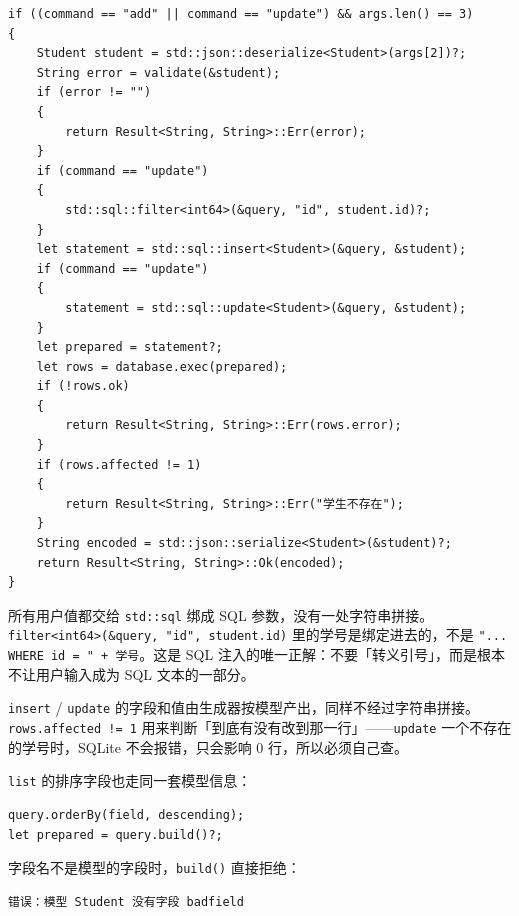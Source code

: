 \par
\medskip
\begin{lstlisting}[style=chali]
if ((command == "add" || command == "update") && args.len() == 3)
{
    Student student = std::json::deserialize<Student>(args[2])?;
    String error = validate(&student);
    if (error != "")
    {
        return Result<String, String>::Err(error);
    }
    if (command == "update")
    {
        std::sql::filter<int64>(&query, "id", student.id)?;
    }
    let statement = std::sql::insert<Student>(&query, &student);
    if (command == "update")
    {
        statement = std::sql::update<Student>(&query, &student);
    }
    let prepared = statement?;
    let rows = database.exec(prepared);
    if (!rows.ok)
    {
        return Result<String, String>::Err(rows.error);
    }
    if (rows.affected != 1)
    {
        return Result<String, String>::Err("学生不存在");
    }
    String encoded = std::json::serialize<Student>(&student)?;
    return Result<String, String>::Ok(encoded);
}
\end{lstlisting}
\par
\medskip

所有用户值都交给 \texttt{std:\allowbreak{}:\allowbreak{}sql} 绑成 SQL 参数，没有一处字符串拼接。 \texttt{filter<\allowbreak{}int64>\allowbreak{}(\allowbreak{}\&query,\allowbreak{} "id",\allowbreak{} student.\allowbreak{}id)\allowbreak{}} 里的学号是绑定进去的，不是 \texttt{".\allowbreak{}.\allowbreak{}.\allowbreak{} WHERE id =\allowbreak{} " + 学号}。这是 SQL 注入的唯一正解：不要「转义引号」，而是根本不让用户输入成为 SQL 文本的一部分。

\texttt{insert} / \texttt{update} 的字段和值由生成器按模型产出，同样不经过字符串拼接。\texttt{rows.\allowbreak{}affected !=\allowbreak{} 1} 用来判断「到底有没有改到那一行」——\texttt{update} 一个不存在的学号时，SQLite 不会报错，只会影响 0 行，所以必须自己查。

\texttt{list} 的排序字段也走同一套模型信息：

\par
\medskip
\begin{lstlisting}[style=chali]
query.orderBy(field, descending);
let prepared = query.build()?;
\end{lstlisting}
\par
\medskip

字段名不是模型的字段时，\texttt{build(\allowbreak{})\allowbreak{}} 直接拒绝：

\par
\medskip
\begin{lstlisting}[style=out]
错误：模型 Student 没有字段 badfield
\end{lstlisting}
\par
\medskip

